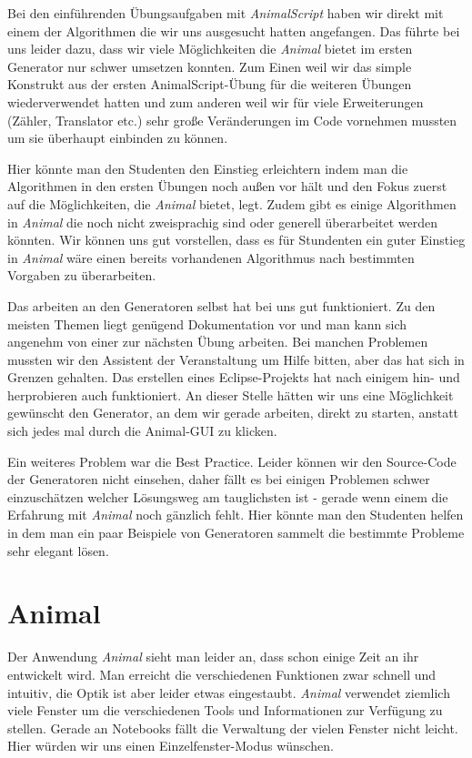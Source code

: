 \documentclass[paper=a4, fontsize=12pt,titlepage=false]{scrartcl}
\begin{document}
Bei den einführenden Übungsaufgaben mit \emph{AnimalScript} haben wir direkt mit einem der Algorithmen die wir uns ausgesucht hatten angefangen. Das führte bei uns leider dazu, dass wir viele Möglichkeiten die \emph{Animal} bietet im ersten Generator nur schwer umsetzen konnten. Zum Einen weil wir das simple Konstrukt aus der ersten AnimalScript-Übung für die weiteren Übungen wiederverwendet hatten und zum anderen weil wir für viele Erweiterungen (Zähler, Translator etc.) sehr große Veränderungen im Code vornehmen mussten um sie überhaupt einbinden zu können.

Hier könnte man den Studenten den Einstieg erleichtern indem man die Algorithmen in den ersten Übungen noch außen vor hält und den Fokus zuerst auf die Möglichkeiten, die \emph{Animal} bietet, legt. Zudem gibt es einige Algorithmen in \emph{Animal} die noch nicht zweisprachig sind oder generell überarbeitet werden könnten. Wir können uns gut vorstellen, dass es für Stundenten ein guter Einstieg in \emph{Animal} wäre einen bereits vorhandenen Algorithmus nach bestimmten Vorgaben zu überarbeiten.

Das arbeiten an den Generatoren selbst hat bei uns gut funktioniert. Zu den meisten Themen liegt genügend Dokumentation vor und man kann sich angenehm von einer zur nächsten Übung arbeiten. Bei manchen Problemen mussten wir den Assistent der Veranstaltung um Hilfe bitten, aber das hat sich in Grenzen gehalten. Das erstellen eines Eclipse-Projekts hat nach einigem hin- und herprobieren auch funktioniert. An dieser Stelle hätten wir uns eine Möglichkeit gewünscht den Generator, an dem wir gerade arbeiten, direkt zu starten, anstatt sich jedes mal durch die Animal-GUI zu klicken.

Ein weiteres Problem war die \glqq Best Practice\grqq. Leider können wir den Source-Code der Generatoren nicht einsehen, daher fällt es bei einigen Problemen schwer einzuschätzen welcher Lösungsweg am tauglichsten ist - gerade wenn einem die Erfahrung mit \emph{Animal} noch gänzlich fehlt. Hier könnte man den Studenten helfen in dem man ein paar Beispiele von Generatoren sammelt die bestimmte Probleme sehr elegant lösen.

\section{Animal}

Der Anwendung \emph{Animal} sieht man leider an, dass schon einige Zeit an ihr entwickelt wird. Man erreicht die verschiedenen Funktionen zwar schnell und intuitiv, die Optik ist aber leider etwas eingestaubt. \emph{Animal} verwendet ziemlich viele Fenster um die verschiedenen Tools und Informationen zur Verfügung zu stellen. Gerade an Notebooks fällt die Verwaltung der vielen Fenster nicht leicht. Hier würden wir uns einen Einzelfenster-Modus wünschen.
\end{document}
